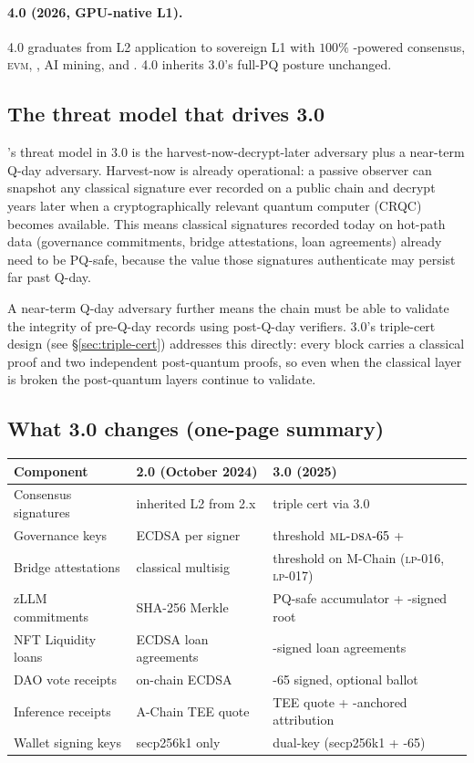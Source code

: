 \paragraph{4.0 (2026, GPU-native L1).}
\Zoo{} 4.0 \cite{zoo-4-0} graduates \Zoo{} from L2 application to
sovereign L1 with $100\%$ \GPU{}-powered consensus, \textsc{evm},
\DEX{}, AI mining, and \FHE{}. 4.0 inherits 3.0's full-PQ posture
unchanged.

\subsection{The threat model that drives 3.0}

\Zoo{}'s threat model in 3.0 is the harvest-now-decrypt-later
adversary plus a near-term Q-day adversary. Harvest-now is already
operational: a passive observer can snapshot any classical signature
ever recorded on a public chain and decrypt years later when a
cryptographically relevant quantum computer (CRQC) becomes available.
This means classical signatures recorded today on hot-path data
(governance commitments, bridge attestations, \NFT{} loan agreements)
already need to be PQ-safe, because the value those signatures
authenticate may persist far past Q-day.

A near-term Q-day adversary further means the chain must be able
to validate the integrity of pre-Q-day records using post-Q-day
verifiers. \Zoo{} 3.0's triple-cert design (see \S\ref{sec:triple-cert})
addresses this directly: every block carries a classical proof and
two independent post-quantum proofs, so even when the classical layer
is broken the post-quantum layers continue to validate.

\subsection{What 3.0 changes (one-page summary)}

\begin{longtable}{p{}p{}p{}}
\toprule
\textbf{Component} & \textbf{2.0 (October 2024)} & \textbf{3.0 (2025)} \\
\midrule
Consensus signatures & inherited L2 from \Lux{} 2.x & triple cert via \Quasar{} 3.0 \cite{lp-020} \\
Governance keys & ECDSA per signer & threshold $\textsc{ml-dsa}{}\text{-}65$ + \Ringtail{} \\
Bridge attestations & classical multisig & threshold \MLDSA{} on M-Chain (\textsc{lp-016}, \textsc{lp-017}) \\
zLLM commitments & SHA-256 Merkle & PQ-safe accumulator + \MLDSA{}-signed root \\
NFT Liquidity loans & ECDSA loan agreements & \Ringtail{}-signed loan agreements \\
DAO vote receipts & on-chain ECDSA & \MLDSA{}-65 signed, optional \FHE{} ballot \\
Inference receipts & A-Chain TEE quote & TEE quote + \Ringtail{}-anchored attribution \\
Wallet signing keys & secp256k1 only & dual-key (secp256k1 + \MLDSA{}-65) \\
\bottomrule
\end{longtable}

